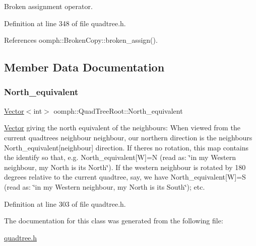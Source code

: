 Broken assignment operator. 



Definition at line 348 of file quadtree.\+h.



References oomph\+::\+Broken\+Copy\+::broken\+\_\+assign().



\subsection{Member Data Documentation}
\mbox{\label{classoomph_1_1QuadTreeRoot_a1fab216e4efa231e156c8406ad2e0da6}} 
\subsubsection{\texorpdfstring{North\+\_\+equivalent}{North\_equivalent}}
{\footnotesize\ttfamily \hyperlink{classoomph_1_1Vector}{Vector}$<$int$>$ oomph\+::\+Quad\+Tree\+Root\+::\+North\+\_\+equivalent\hspace{0.3cm}{\ttfamily [private]}}



\hyperlink{classoomph_1_1Vector}{Vector} giving the north equivalent of the neighbours\+: When viewed from the current quadtree\textquotesingle{}s {\ttfamily neighbour} neighbour, our northern direction is the neighbour\textquotesingle{}s North\+\_\+equivalent\mbox{[}neighbour\mbox{]} direction. If there\textquotesingle{}s no rotation, this map contains the identify so that, e.\+g. {\ttfamily North\+\_\+equivalent}\mbox{[}W\mbox{]}=N (read as\+: \char`\"{}in my Western
neighbour, my North is its North\char`\"{}). If the western neighbour is rotated by 180 degrees relative to the current quadtree, say, we have {\ttfamily North\+\_\+equivalent}\mbox{[}W\mbox{]}=S (read as\+: \char`\"{}in my Western
neighbour, my North is its South\char`\"{}); etc. 



Definition at line 303 of file quadtree.\+h.



The documentation for this class was generated from the following file\+:\begin{DoxyCompactItemize}
\item 
\hyperlink{quadtree_8h}{quadtree.\+h}\end{DoxyCompactItemize}
